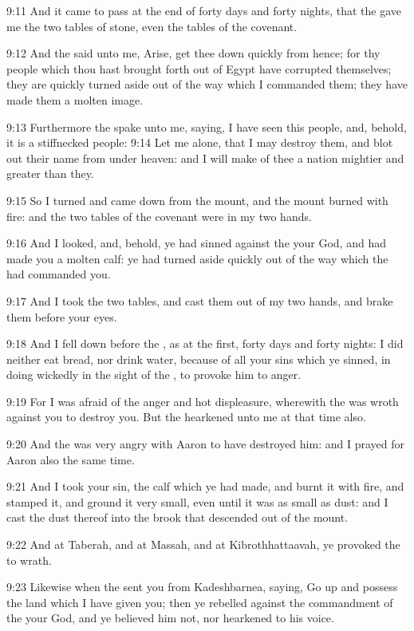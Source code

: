 9:11 And it came to pass at the end of forty days and forty nights,
that the \LORD gave me the two tables of stone, even the tables of the
covenant.

9:12 And the \LORD said unto me, Arise, get thee down quickly from
hence; for thy people which thou hast brought forth out of Egypt have
corrupted themselves; they are quickly turned aside out of the way
which I commanded them; they have made them a molten image.

9:13 Furthermore the \LORD spake unto me, saying, I have seen this
people, and, behold, it is a stiffnecked people: 9:14 Let me alone,
that I may destroy them, and blot out their name from under heaven:
and I will make of thee a nation mightier and greater than they.

9:15 So I turned and came down from the mount, and the mount burned
with fire: and the two tables of the covenant were in my two hands.

9:16 And I looked, and, behold, ye had sinned against the \LORD your
God, and had made you a molten calf: ye had turned aside quickly out
of the way which the \LORD had commanded you.

9:17 And I took the two tables, and cast them out of my two hands, and
brake them before your eyes.

9:18 And I fell down before the \LORD, as at the first, forty days and
forty nights: I did neither eat bread, nor drink water, because of all
your sins which ye sinned, in doing wickedly in the sight of the \LORD,
to provoke him to anger.

9:19 For I was afraid of the anger and hot displeasure, wherewith the
\LORD was wroth against you to destroy you. But the \LORD hearkened unto
me at that time also.

9:20 And the \LORD was very angry with Aaron to have destroyed him: and
I prayed for Aaron also the same time.

9:21 And I took your sin, the calf which ye had made, and burnt it
with fire, and stamped it, and ground it very small, even until it was
as small as dust: and I cast the dust thereof into the brook that
descended out of the mount.

9:22 And at Taberah, and at Massah, and at Kibrothhattaavah, ye
provoked the \LORD to wrath.

9:23 Likewise when the \LORD sent you from Kadeshbarnea, saying, Go up
and possess the land which I have given you; then ye rebelled against
the commandment of the \LORD your God, and ye believed him not, nor
hearkened to his voice.

